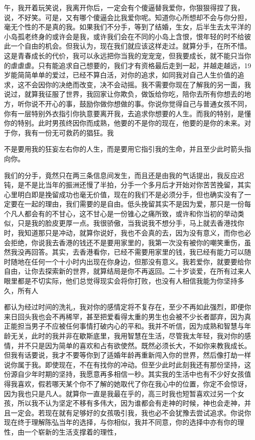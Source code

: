 \documentclass{article}
\begin{document}
午，我开着玩笑说，我离开你后，一定会有个傻逼替我爱你，你狠狠得捏了我，说，不好笑。可是，又有哪个傻逼会比我爱你呢。知道你心所想却不会与你分担，毫无个性的不是真的我。如果我们不分手，等到了结婚，生女，后半生去太平洋的小岛孤老终身的或许会是我，或许我们会在不同的小岛上含恨，恨年轻的时不给彼此一个自由的机会。但我认为，现在我们就应该这样走过。就算分手，在所不惜。这是青春成长的代价，我可以永远把你当我的宠宠宠，但我要成长，就不能只当你的虐虐虐。只有能追求自己想要的，我们才有资格最后走到一起，并越走越远，19岁能简简单单的爱过，已经不算白活，对你的追求，如同我对自己人生价值的追求，这不会因你的决绝而改变，决不会动摇。我不需要你现在了解我的另一面，我说过，就算我征服了世界，我回家让你欺负，做饭给你吃，陪你去所有你想去的地方，听你说不开心的事，鼓励你做你想做的事。你说你觉得自己与普通女孩不同，你有一层特别外衣指引你执意要离开我，去追求你想要的人生。而我的特别，是懂你的特别。此时男孩终因你而成熟，他要的不是你的现在，他要的是你的未来。对于你，我有一份无可救药的猖狂。我

\newpage 

不是要用我的狂妄左右你的人生，而是要用它指引我的生命，并且至少此时箭头指向你。

我们的分手，竟然只在两三条信息间发生，而且还是由我的气话提出，我反应迟钝，是不是比当年的振洲还慢了半拍，分手一个多月后才开始对你苦苦挽留，其实心里明白即是挽留成功也毫无价值，现在的我们不是必须分手，但也确实没有了一定要在一起的理由，我们需要的是自由。低头挽留其实不是因为爱，那只是一份每个凡人都会有的不甘心，这不甘心是一份锥心之痛所致，或许和你当初的举动类似，只是我的脸皮更厚一点。我很骄傲，当我说我不想分手，马上就去香港找你时，我知道那只是冲动，就算你说好，我也不会真的去，因为没有意义，而你也必会拒绝，你说我去香港的钱还不是要用家里的，我第一次没有被你的嘲笑重伤，虽然我没再回答。其实，去香港看你，已经不需要用家里的钱，我已经有能力可以随时随地在任何一个十小时内出现在你身边，但那没有意义。我若爱你，就要要给你自由，让你去探索新的世界，就算结局是你不再返回。二十岁谈爱，在所有过来人眼里都是不切实际，他们总觉得现实会将你打败，也没有人相信我能为你坚持多久，所有人

\newpage 

都认为经过时间的洗礼，我对你的感情定将不复存在，至少不再如此强烈，即便你来日回头我也会不再稀罕，甚至把爱看得太重的男生也会被不少长者鄙弃，因为真正能担当男子不应被任何事情打破内心的平和。我并不听信，因为成熟和智慧与年龄无关，此时的我并非在歇斯底里，我用智慧在生活，尽管我太年轻，我对你的感情，并不只是因为简单的喜欢和占有欲使然。既然必须长大，不如你来教我成长。但我有话要说，我才不要等你到了适婚年龄再重新闯入你的世界，然后像打劫一样说你属于我。即使现在，不在有找你的冲动。但至少此时此刻我还有那份坚持，这份源自少年时期的坚持，我愿意再多相信一秒。其实我的生活中也有不少好女孩值得我喜欢，假若哪天某个你不了解的她取代了你在我心中的位置，你定不会惊讶，因为我也只是凡人。就算你一直是我最在乎的，高三时我也短暂喜欢过另一个女孩，所以我不认为坚定不移有多伟大，因为谁都会有走神的时候，神也会走神，并且一定会。若现在就有足够好的女孩吸引我，我也必不会犹豫去尝试追求。你说你现在终于理解陈弘当年的选择，与你相似，我并不同意，你的选择中亦有你的理性，由一个崭新的生活支撑着的理性，
\end{document}
